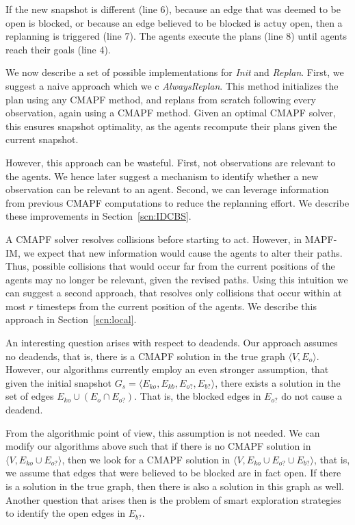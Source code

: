 \documentclass[letterpaper]{article} %
\def\
UrlFont{\rm}  %
\newcommand{\eko}{E_{ko}} %
\newcommand{\ekb}{E_{kb}} %
\newcommand{\eao}{E_{o?}} %
\newcommand{\eab}{E_{b?}} %
\theoremstyle{definition}
\begin{document}
If the new snapshot is different (line 6), because an edge that was deemed to be open is blocked, or because an edge believed to be blocked is actuy open, then a replanning is triggered (line 7).
The agents execute the plans (line 8) until  agents reach their goals (line 4).

We now describe a set of possible implementations for {\em Init} and {\em Replan}. First, we suggest a naive approach which we c {\em AlwaysReplan}. This method initializes the plan using any CMAPF method, and replans from scratch following every observation, again using a CMAPF method. Given an optimal CMAPF solver, this ensures snapshot optimality, as the agents recompute their plans given the current snapshot.


However, this approach can be  wasteful. First, not  observations are relevant to the agents. We hence later suggest a mechanism to identify whether a new observation can be relevant to an agent. Second, we can leverage information from previous CMAPF computations to reduce the replanning effort. We describe these improvements in Section~\ref{scn:IDCBS}.

A CMAPF solver resolves  collisions before starting to act. However, in MAPF-IM, we expect that new information would cause the agents to alter their paths. Thus, possible collisions that would occur far from the current positions of the agents may no longer be relevant, given the revised paths. Using this intuition we can suggest a second approach, that resolves only collisions that occur within at most $r$ timesteps from the current position of the agents. We describe this approach in Section~\ref{scn:local}.


An interesting question arises with respect to deadends. Our approach assumes no deadends, that is, there is a CMAPF solution in the true graph $\langle V, E_o \rangle$. However, our algorithms currently employ an even stronger assumption, that given the initial snapshot $G_s=\langle \eko, \ekb, \eao, \eab \rangle$, there exists a solution in the set of edges $\eko \cup (E_o \cap \eao)$. That is, the blocked edges in $\eao$ do not cause a deadend.

From the algorithmic point of view, this assumption is not needed.
We can modify our algorithms above such that if there is no CMAPF solution in $\langle V, \eko \cup \eao \rangle$, then we look for a CMAPF solution in $\langle V, \eko \cup \eao \cup \eab \rangle $, that is, we assume that  edges that were believed to be blocked are in fact open. If there is a solution in the true graph, then there is also a solution in this graph as well. Another question that arises then is the problem of smart exploration strategies to identify the open edges in $\eab$.
\end{document}
